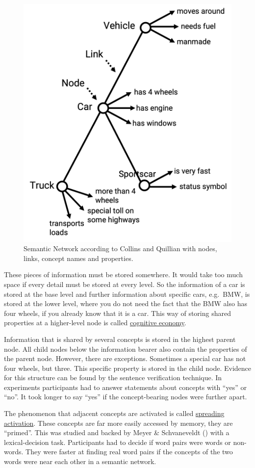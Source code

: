 \documentclass[
]{krantz}
\begin{document}
\begin{figure}

{\centering \includegraphics[width=0.6\linewidth]{images/ch7/fig5} 

}

\caption{Semantic Network according to Collins and Quillian with nodes, links, concept names and properties. }\label{fig:network}
\end{figure}

These pieces of information must be stored somewhere. It would take too much space if every detail must be stored at every level. So the information of a car is stored at the base level and further information about specific cars, e.g.~BMW, is stored at the lower level, where you do not need the fact that the BMW also has four wheels, if you already know that it is a car. This way of storing shared properties at a higher-level node is called \hyperref[cognitive-economy]{cognitive economy}.

Information that is shared by several concepts is stored in the highest parent node. All child nodes below the information bearer also contain the properties of the parent node. However, there are exceptions. Sometimes a special car has not four wheels, but three. This specific property is stored in the child node. Evidence for this structure can be found by the sentence verification technique. In experiments participants had to answer statements about concepts with ``yes'' or ``no''. It took longer to say ``yes'' if the concept-bearing nodes were further apart.

The phenomenon that adjacent concepts are activated is called \hyperref[spreading-activation]{spreading activation}. These concepts are far more easily accessed by memory, they are ``primed''. This was studied and backed by Meyer \& Schvaneveldt () with a lexical-decision task. Participants had to decide if word pairs were words or non-words. They were faster at finding real word pairs if the concepts of the two words were near each other in a semantic network.
\end{document}
